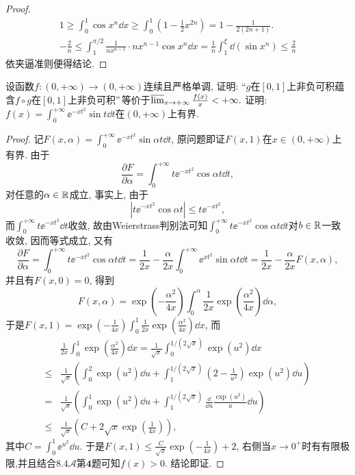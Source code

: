 \begin{quizb}
\begin{proof}
\begin{gather*}
1\geqslant\int_{0}^{1}\cos x^n\dd x\geqslant\int_{0}^{1}\left(1-\frac{1}{2}x^{2n}\right)=1-\frac{1}{2(2n+1)}.\\
-\frac{2}{n}\leqslant\int_{1}^{\pi/2}\frac{1}{nx^{n-1}}\cdot nx^{n-1}\cos x^n\dd x=\frac{1}{n}\int_{1}^{\xi}\dd\left(\sin x^n\right)\leqslant\frac{2}{n}
\end{gather*}
依夹逼准则便得结论.
\end{proof}
\woe 设函数\(f:(0,+\infty)\rightarrow(0,+\infty)\)连续且严格单调, 证明: “\(g\)在\([0,1]\)上非负可积蕴含\(f\circ g\)在\([0,1]\)上非负可积”\(\,\)等价于\(\varlimsup_{x\rightarrow+\infty}\frac{f(x)}{x}<+\infty.\)
\woe 证明: \(f(x)=\int_{0}^{+\infty}\ee^{-xt^2}\sin t\dd t\)在\((0,+\infty)\)上有界.
\begin{proof}
记\(F(x,\alpha)=\int_{0}^{+\infty}\ee^{-xt^2}\sin\alpha t\dd t\), 原问题即证\(F(x,1)\)在\(x\in (0,+\infty)\)上有界. 由于\[\frac{\partial F}{\partial \alpha}=\int_{0}^{+\infty}t\ee^{-xt^2}\cos\alpha t\dd t,\]对任意的\(\alpha\in\mathbb{R}\)成立, 事实上, 由于\[\left|t\ee^{-xt^2}\cos\alpha t\right|\leqslant t\ee^{-xt^2},\]而\(\int_{0}^{+\infty}t\ee^{-xt^2}\dd t\)收敛, 故由Weierstrass判别法可知\(\int_{0}^{+\infty}t\ee^{-xt^2}\cos\alpha t\dd t\)对\(b\in\mathbb{R}\)一致收敛, 因而等式成立, 又有\[\frac{\partial F}{\partial \alpha}=\int_{0}^{+\infty}t\ee^{-xt^2}\cos\alpha t\dd t=\frac{1}{2x}-\frac{\alpha}{2x}\int_{0}^{+\infty}\ee^{xt^2}\sin\alpha t\dd t=\frac{1}{2x}-\frac{\alpha}{2x}F(x,\alpha),\]并且有\(F(x,0)=0\), 得到\[F(x,\alpha)=\exp\left(-\frac{\alpha^2}{4x}\right)\int_{0}^{\alpha}\frac{1}{2x}\exp\left(\frac{\alpha^2}{4x}\right)\dd\alpha,\]于是\(F(x,1)=\exp\left(-\frac{1}{4x}\right)\int_{0}^{1}\frac{1}{2x}\exp\left(\frac{\alpha^2}{4x}\right)\dd x\), 而\[\begin{split}
&\frac{1}{2x}\int_{0}^{1}\exp\left(\frac{\alpha^2}{4x}\right)\dd x=\frac{1}{\sqrt{x}}\int_{0}^{1/(2\sqrt{x})}\exp\left(u^2\right)\dd x\\\leqslant&\frac{1}{\sqrt{x}}\left(\int_{0}^{2}\exp\left(u^2\right)\dd u+\int_{1}^{1/(2\sqrt{x})}\left(2-\frac{1}{u^2}\right)\exp\left(u^2\right)\dd u\right)\\=&\frac{1}{\sqrt{x}}\left(\int_{0}^{1}\exp\left(u^2\right)\dd u+\int_{1}^{1/(2\sqrt{x})}\frac{\dd}{\dd u}\frac{\exp(u^2)}{u}\dd u\right)\\\leqslant&\frac{1}{\sqrt{x}}\left(C+2\sqrt{x}\exp\left(\frac{1}{4x}\right)\right),
\end{split}\]其中\(C=\int_{0}^{1}\ee^{u^2}\dd u\). 于是\(F(x,1)\leqslant\frac{C}{\sqrt{x}}\exp\left(-\frac{1}{4x}\right)+2\), 右侧当\(x\rightarrow 0^+\)时有有限极限,并且结合\(\boldsymbol{8.4 \mathcal{A}}\)第\(\boldsymbol{4}\)题可知\(f(x)>0\). 结论即证.

\end{proof}
\end{quizb}
